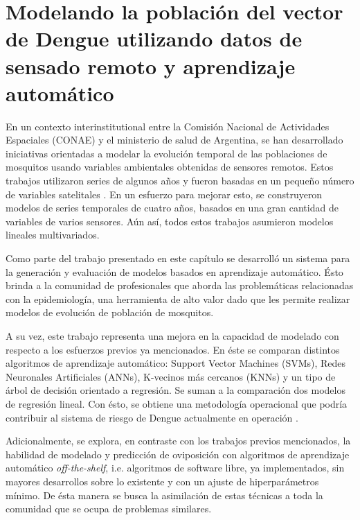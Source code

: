 %
%

\justifying
\chapter{Modelando la población del vector de Dengue utilizando datos de sensado
        remoto y aprendizaje automático}

  \par En un contexto interinstitutional entre
    la Comisión Nacional de Actividades Espaciales (CONAE) y el ministerio de salud
    de Argentina, se han desarrollado iniciativas orientadas a modelar la evolución temporal de
    las poblaciones de mosquitos usando variables ambientales obtenidas de
    sensores remotos. Estos trabajos utilizaron series de algunos años y fueron
    basadas en un pequeño número de variables satelitales \cite{ndwi_erffectiveness, modis_data}.
    En un esfuerzo para mejorar esto, se construyeron modelos
    de series temporales de cuatro años, basados en una gran cantidad de variables
    de varios sensores\cite{temporal_modeling}.
    Aún así, todos estos trabajos asumieron modelos lineales multivariados.

  \par Como parte del trabajo presentado en este capítulo se desarrolló un
    sistema
    para la generación y evaluación de modelos basados en aprendizaje automático.
    Ésto brinda a la comunidad de profesionales que
    aborda las problemáticas relacionadas con la epidemiología, una herramienta
    de alto valor dado que les permite realizar
    modelos de evolución de población de mosquitos.

  \par A su vez, este trabajo representa una
    mejora en la capacidad de modelado con respecto a los esfuerzos previos ya
    mencionados. En éste se comparan distintos algoritmos de
    aprendizaje automático: Support Vector Machines (SVMs),
    Redes Neuronales Artificiales (ANNs), K-vecinos más cercanos (KNNs) y un tipo
    de árbol de decisión orientado a regresión.
    Se suman a la comparación dos modelos de regresión lineal.
    Con ésto, se
    obtiene una metodología operacional que podría contribuir al sistema de riesgo
    de Dengue actualmente en operación \cite{porcasi_operative, analisis_cordoba}.

  \par Adicionalmente, se explora, en contraste con los trabajos previos mencionados,
    la habilidad de modelado y predicción de oviposición con algoritmos de aprendizaje
    automático \textit{off-the-shelf}, i.e. algoritmos de software libre, ya
    implementados, sin mayores desarrollos sobre lo existente y con un ajuste de
    hiperparámetros mínimo. De ésta manera se busca la asimilación de estas
    técnicas a toda la comunidad que se ocupa de problemas similares.

